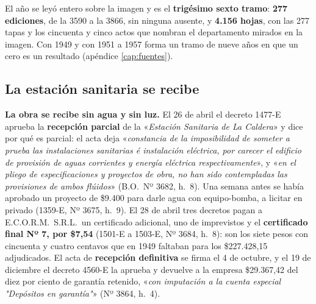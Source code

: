 El año se leyó entero sobre la imagen y es el \textbf{trigésimo sexto tramo}: \textbf{277
ediciones}, de la 3590 a la 3866, sin ninguna ausente, y \textbf{4.156 hojas}, con las 277 tapas y
los cincuenta y cinco actos que nombran el departamento mirados en la imagen. Con 1949 y con 1951 a 1957 forma un
tramo de nueve años en que un cero es un resultado (apéndice \ref{cap:fuentes}).

\subsection*{La estación sanitaria se recibe}

\textbf{La obra se recibe sin agua y sin luz.} El 26 de abril el decreto 1477-E aprueba la
\textbf{recepción parcial} de la «\textit{Estación Sanitaria de La Caldera}» y dice por qué es
parcial: el acta deja «\textit{constancia de la imposibilidad de someter a prueba las instalaciones
sanitarias é instalación eléctrica, por carecer el edificio de provisión de aguas corrientes y
energía eléctrica respectivamente}», y «\textit{en el pliego de especificaciones y proyectos de obra,
no han sido contempladas las provisiones de ambos flúidos}» (B.O.\ Nº 3682, h.\ 8). Una semana antes
se había aprobado un proyecto de \$9.400 para darle agua con equipo-bomba, a licitar en privado
(1359-E, Nº 3675, h.\ 9). El 28 de abril tres decretos pagan a E.C.O.R.M.\ S.R.L.\ un certificado
adicional, uno de imprevistos y el \textbf{certificado final Nº 7, por \$7,54} (1501-E a 1503-E,
Nº 3684, h.\ 8): son los siete pesos con cincuenta y cuatro centavos que en 1949 faltaban para los
\$227.428,15 adjudicados. El acta de \textbf{recepción definitiva} se firma el 4 de octubre, y el 19
de diciembre el decreto 4560-E la aprueba y devuelve a la empresa \$29.367,42 del diez por ciento de
garantía retenido, «\textit{con imputación a la cuenta especial "Depósitos en garantía"}» (Nº 3864,
h.\ 4).

